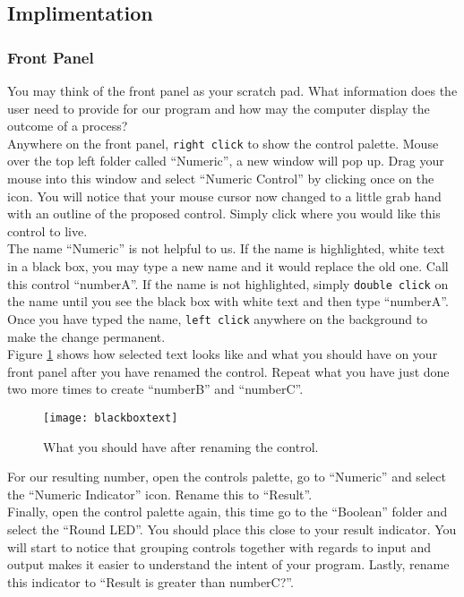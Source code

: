 	\subsection{Implimentation}
	\subsubsection{Front Panel}
	\label{HowToPlace}
	You may think of the front panel as your scratch pad. What information does the user need to provide for our program and how may the computer display the outcome of a process?\\
	
	Anywhere on the front panel, \texttt{right click} to show the control palette. Mouse over the top left folder called ``Numeric'', a new window will pop up. Drag your mouse into this window and select ``Numeric Control'' by clicking once on the icon. You will notice that your mouse cursor now changed to a little grab hand with an outline of the proposed control. Simply click where you would like this control to live.\\
	
	The name ``Numeric'' is not helpful to us. If the name is highlighted, white text in a black box, you may type a new name and it would replace the old one. Call this control ``numberA''. If the name is not highlighted, simply \texttt{double click} on the name until you see the black box with white text and then type ``numberA''. Once you have typed the name, \texttt{left click} anywhere on the background to make the change permanent.\\
	
	Figure \ref{blackboxtext} shows how selected text looks like and what you should have on your front panel after you have renamed the control. Repeat what you have just done two more times to create ``numberB'' and ``numberC''.\\
	\begin{figure}
		\centering
		\texttt{[image: blackboxtext]}
		\caption{What you should have after renaming the control.}
		\label{blackboxtext}
	\end{figure}
	
	For our resulting number, open the controls palette, go to ``Numeric'' and select the ``Numeric Indicator'' icon. Rename this to ``Result''.\\
	
	Finally, open the control palette again, this time go to the ``Boolean'' folder and select the ``Round LED''. You should place this close to your result indicator. You will start to notice that grouping controls together with regards to input and output makes it easier to understand the intent of your program. Lastly, rename this indicator to ``Result is greater than numberC?''.\\
	
